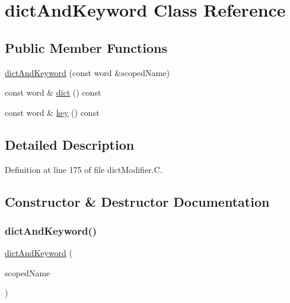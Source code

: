 \hypertarget{classdictAndKeyword}{}\section{dict\+And\+Keyword Class Reference}
\label{classdictAndKeyword}
\subsection*{Public Member Functions}
\begin{DoxyCompactItemize}
\item 
\hyperlink{classdictAndKeyword_aae5baa81f2366e37423a68364f034438}{dict\+And\+Keyword} (const word \&scoped\+Name)
\item 
const word \& \hyperlink{classdictAndKeyword_a7b4cd868842d5993c0a18551c50fa013}{dict} () const
\item 
const word \& \hyperlink{classdictAndKeyword_a47554844ac197506c7d6d3fb69cd591a}{key} () const
\end{DoxyCompactItemize}


\subsection{Detailed Description}


Definition at line 175 of file dict\+Modifier.\+C.



\subsection{Constructor \& Destructor Documentation}
\mbox{\label{classdictAndKeyword_aae5baa81f2366e37423a68364f034438}} 
\subsubsection{\texorpdfstring{dict\+And\+Keyword()}{dictAndKeyword()}}
{\footnotesize\ttfamily \hyperlink{classdictAndKeyword}{dict\+And\+Keyword} (\begin{DoxyParamCaption}\item[{const word \&}]{scoped\+Name }\end{DoxyParamCaption})\hspace{0.3cm}{\ttfamily [inline]}}



